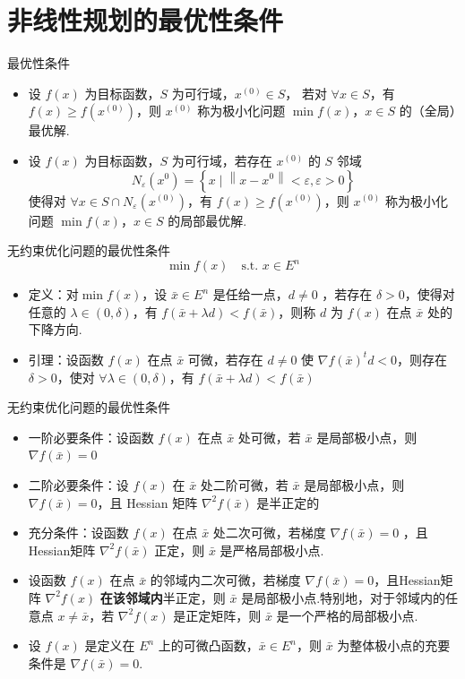 \section{非线性规划的最优性条件}
\begin{remark}
    最优性条件 
    \begin{itemize}
        \item 设 $f(x)$ 为目标函数，$S$ 为可行域，$x^{(0)} \in S$， 若对 $\forall x \in S$，有 $f(x) \ge f(x^{(0)})$，则 $x^{(0)}$ 称为极小化问题 $\min f(x)$，$x \in S$ 的（全局）最优解.
        \item 设 $f(x)$ 为目标函数，$S$ 为可行域，若存在 $x^{(0)}$ 的 $S$ 邻域 \[N_{\varepsilon}\left(x^{0}\right)=\left\{x \mid\left\|x-x^{0}\right\|<\varepsilon, \varepsilon>0\right\}\]使得对 $\forall x \in S \cap N_\varepsilon(x^{(0)})$，有 $f(x) \ge f(x^{(0)})$，则 $x^{(0)}$ 称为极小化问题 $\min f(x)$，$x \in S$ 的局部最优解.
    \end{itemize}
\end{remark}

\begin{remark}
    无约束优化问题的最优性条件\[\min f(x) \quad \text{s.t. } x \in E^n\]
    \begin{itemize}
        \item 定义：对$\min f(x)$，设 $\bar{x} \in E^n$ 是任给一点，$d\neq 0$ ，若存在 $\delta > 0$，使得对任意的 $\lambda \in (0, \delta)$，有 $f(\bar{x} + \lambda d) < f(\bar{x})$，则称 $d$ 为 $f(x)$ 在点 $\bar{x}$ 处的下降方向.
        \item 引理：设函数 $f(x)$ 在点 $\bar{x}$ 可微，若存在 $d \neq 0$ 使 $\nabla f(\bar{x})^td < 0$，则存在 $\delta > 0$，使对 $\forall \lambda\in (0, \delta)$，有 $f(\bar{x} + \lambda d) < f(\bar{x})$
    \end{itemize}
\end{remark}

\begin{remark}
    无约束优化问题的最优性条件\begin{itemize}
        \item 一阶必要条件：设函数 $f(x)$ 在点 $\bar{x}$ 处可微，若 $\bar{x}$ 是局部极小点，则 $\nabla f(\bar{x}) = 0$
        \item 二阶必要条件：设 $f(x)$ 在 $\bar{x}$ 处二阶可微，若 $\bar{x}$ 是局部极小点，则 $\nabla f(\bar{x}) = 0$，且 Hessian 矩阵 $\nabla^2f(\bar{x})$ 是半正定的
        \item 充分条件：设函数 $f(x)$ 在点 $\bar{x}$ 处二次可微，若梯度 $\nabla f(\bar{x}) = 0$ ，且 Hessian矩阵 $\nabla^2f(\bar{x})$ 正定，则 $\bar{x}$ 是严格局部极小点.
        \item 设函数 $f(x)$ 在点 $\bar{x}$ 的邻域内二次可微，若梯度 $\nabla f(\bar{x}) = 0$，且Hessian矩阵 $\nabla^2f(x)$ \textbf{在该邻域内}半正定，则 $\bar{x}$ 是局部极小点.特别地，对于邻域内的任意点 $x\neq \bar{x}$，若 $\nabla^2f(x)$ 是正定矩阵，则 $\bar{x}$ 是一个严格的局部极小点.
        \item 设 $f(x)$ 是定义在 $E^n$ 上的可微凸函数，$\bar{x} \in E^n$，则 $\bar{x}$ 为整体极小点的充要条件是 $\nabla f(\bar{x}) = 0$.
    \end{itemize}
\end{remark}


